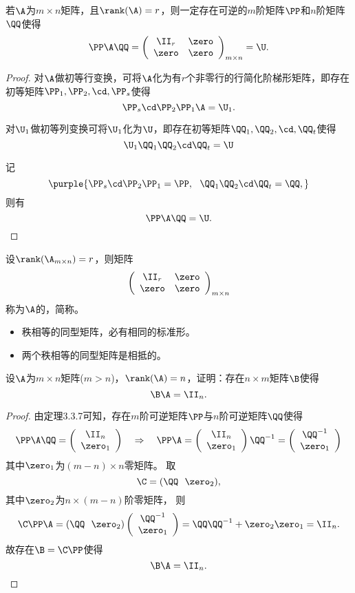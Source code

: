 \begin{dingli}
  若$\A$为$m\times n$矩阵，且$\rank(\A)=r$，则一定存在可逆的$m$阶矩阵$\PP$和$n$阶矩阵$\QQ$使得
  $$
  \PP\A\QQ=\left(
    \begin{array}{cc}
      \II_r&\zero\\
      \zero&\zero
    \end{array}
  \right)_{m\times n} = \U.
  $$
\end{dingli}
\begin{proof}
对$\A$做初等行变换，可将$\A$化为有$r$个非零行的行简化阶梯形矩阵，即存在初等矩阵$\PP_1,\PP_2,\cd,\PP_s$使得
$$
\PP_s\cd\PP_2\PP_1\A=\U_1.
$$

对$\U_1$做初等列变换可将$\U_1$化为$\U$，即存在初等矩阵$\QQ_1,\QQ_2,\cd,\QQ_t$使得
$$
\U_1\QQ_1\QQ_2\cd\QQ_t=\U
$$

记
$$
\purple{\PP_s\cd\PP_2\PP_1=\PP, ~~\QQ_1\QQ_2\cd\QQ_t=\QQ,}
$$
则有
$$
\PP\A\QQ=\U.
$$
\end{proof}

\begin{dingyi}[相抵标准形]
  设$\rank(\A_{m\times n})=r$，则矩阵
  $$
  \left(
    \begin{array}{cc}
      \II_r&\zero\\
      \zero&\zero
    \end{array}
  \right)_{m\times n} 
  $$称为$\A$的，简称。
\end{dingyi}

\begin{itemize}
\item 秩相等的同型矩阵，必有相同的标准形。
\item 两个秩相等的同型矩阵是相抵的。
\end{itemize}

\begin{li}
  设$\A$为$m\times n$矩阵($m>n$)，$\rank(\A)=n$，证明：存在$n\times m$矩阵$\B$使得
  $$
  \B\A=\II_n.
  $$
\end{li}
\begin{proof}
由定理3.3.7可知，存在$m$阶可逆矩阵$\PP$与$n$阶可逆矩阵$\QQ$使得
$$
\PP\A\QQ=\left(
  \begin{array}{c}
    \II_n\\
    \zero_1
  \end{array}
\right)     
~~~\Rightarrow~~~
\PP\A=\left(
  \begin{array}{c}
    \II_n\\
    \zero_1
  \end{array}
\right)\QQ^{-1}=\left(
  \begin{array}{c}
    \QQ^{-1}\\
    \zero_1
  \end{array}
\right)
$$
其中$\zero_1$为$(m-n)\times n$零矩阵。
取
$$
\C=(\QQ~~\zero_2),
$$
其中$\zero_2$为$n\times(m-n)$阶零矩阵， 则
$$
\C\PP\A=(\QQ~~\zero_2)\left(
  \begin{array}{c}
    \QQ^{-1}\\
    \zero_1
  \end{array}
\right)=\QQ\QQ^{-1}+\zero_2\zero_1=\II_n.
$$ 
故存在$\B=\C\PP$使得
$$
\B\A=\II_n.
$$
\end{proof}

